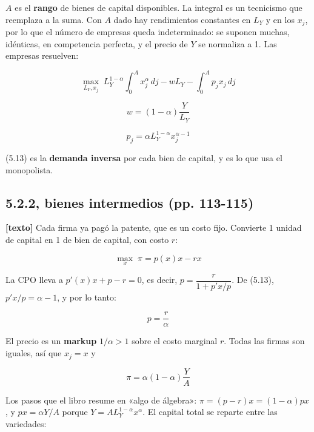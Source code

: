 \documentclass[11pt,a4paper]{article}
\begin{document}
$A$ es el \textbf{rango} de bienes de capital disponibles. La integral es un tecnicismo que reemplaza a la suma. Con $A$ dado hay rendimientos constantes en $L_Y$ y en los $x_j$, por lo que el número de empresas queda indeterminado: se suponen muchas, idénticas, en competencia perfecta, y el precio de $Y$ se normaliza a 1. Las empresas resuelven:

\begin{equation*}\max_{L_Y, x_j} \; L_Y^{1-\alpha}\int_0^A x_j^\alpha\, dj - wL_Y - \int_0^A p_j x_j\, dj\end{equation*}

\begin{equation*}w = (1-\alpha)\frac{Y}{L_Y} \tag{5.12}\end{equation*}

\begin{equation*}p_j = \alpha L_Y^{1-\alpha} x_j^{\alpha-1} \tag{5.13}\end{equation*}

(5.13) es la \textbf{demanda inversa} por cada bien de capital, y es lo que usa el monopolista.

\subsection*{5.2.2, bienes intermedios (pp. 113-115)}

\textbf{[texto]} Cada firma ya pagó la patente, que es un costo fijo. Convierte 1 unidad de capital en 1 de bien de capital, con costo $r$:

\begin{equation*}\max_x \; \pi = p(x)x - rx\end{equation*}

La CPO lleva a $p'(x)x + p - r = 0$, es decir, $p = \dfrac{r}{1 + p'x/p}$. De (5.13), $p'x/p = \alpha - 1$, y por lo tanto:

\begin{equation*}p = \frac{r}{\alpha}\end{equation*}

El precio es un \textbf{markup} $1/\alpha > 1$ sobre el costo marginal $r$. Todas las firmas son iguales, así que $x_j = x$ y

\begin{equation*}\pi = \alpha(1-\alpha)\frac{Y}{A} \tag{5.14}\end{equation*}

Los pasos que el libro resume en «algo de álgebra»: $\pi = (p-r)x = (1-\alpha)px$, y $px = \alpha Y/A$ porque $Y = AL_Y^{1-\alpha}x^\alpha$. El capital total se reparte entre las variedades:
\end{document}
